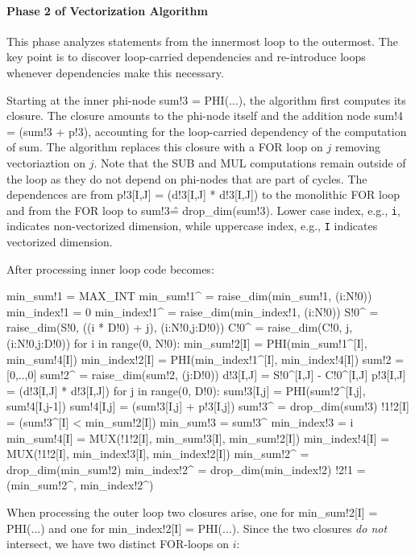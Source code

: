 \paragraph{Phase 2 of Vectorization Algorithm}

This phase analyzes statements from the innermost loop to the outermost. The key point is to discover loop-carried dependencies and re-introduce loops whenever dependencies make this necessary.

Starting at the inner phi-node {\sf sum!3 = PHI(...)}, the algorithm first computes its closure. The closure amounts to the phi-node itself and the addition node {\sf sum!4 = (sum!3 + p!3)}, accounting for the loop-carried dependency of the computation of {\sf sum}. The algorithm replaces this closure with a FOR loop on $j$ removing vectoriaztion on $j$. Note that the SUB and MUL computations remain outside of the loop as they do not depend on phi-nodes that are part of cycles. The dependences are from {\sf p!3[I,J] = (d!3[I,J] * d!3[I,J])} to the monolithic FOR loop and from the FOR loop to {\sf sum!3\^ = drop\_dim(sum!3)}. Lower case index, e.g., \texttt{i}, indicates non-vectorized dimension, while uppercase index, e.g., \texttt{I} indicates vectorized dimension.

After processing inner loop code becomes:

{\small
\begin{pythonn}
min_sum!1 = MAX_INT
min_sum!1^ = raise_dim(min_sum!1, (i:N!0))
min_index!1 = 0
min_index!1^ = raise_dim(min_index!1, (i:N!0))
S!0^ = raise_dim(S!0, ((i * D!0) + j), (i:N!0,j:D!0))
C!0^ = raise_dim(C!0, j, (i:N!0,j:D!0))
for i in range(0, N!0):
  min_sum!2[I] = PHI(min_sum!1^[I], min_sum!4[I]) 
  min_index!2[I] = PHI(min_index!1^[I], min_index!4[I])  
  sum!2 = [0,..,0] 
  sum!2^ = raise_dim(sum!2, (j:D!0))
  d!3[I,J] = S!0^[I,J] - C!0^[I,J]
  p!3[I,J] = (d!3[I,J] * d!3[I,J])
  for j in range(0, D!0):
    sum!3[I,j] = PHI(sum!2^[I,j], sum!4[I,j-1])       
    sum!4[I,j] = (sum!3[I,j] + p!3[I,j])
  sum!3^ = drop_dim(sum!3)     
  !1!2[I] = (sum!3^[I] < min_sum!2[I])
  min_sum!3 = sum!3^
  min_index!3 = i
  min_sum!4[I] = MUX(!1!2[I], min_sum!3[I], min_sum!2[I])
   min_index!4[I] = MUX(!1!2[I], min_index!3[I], min_index!2[I])
min_sum!2^ = drop_dim(min_sum!2)
min_index!2^ = drop_dim(min_index!2)   
!2!1 = (min_sum!2^, min_index!2^)
\end{pythonn}
}

When processing the outer loop two closures arise, one for {\sf min\_sum!2[I] = PHI(...)} and one 
for {\sf min\_index!2[I] = PHI(...)}. Since the two closures \emph{do not} intersect, we have two distinct FOR-loops on $i$:

